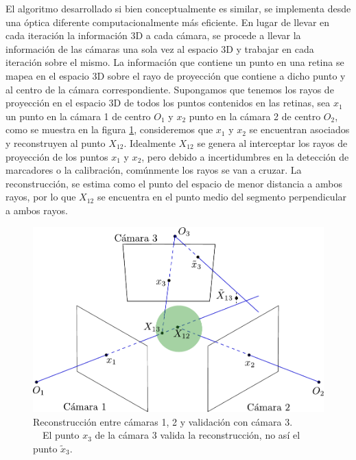 El algoritmo desarrollado si bien conceptualmente es similar, se implementa desde una óptica diferente computacionalmente más eficiente.
En lugar de llevar en cada iteración la información 3D a cada cámara, se procede a llevar la información de las cámaras una sola vez al espacio 3D y trabajar en cada iteración sobre el mismo. La información que contiene un punto en una retina se mapea en el espacio 3D sobre el rayo de proyección que contiene a dicho punto y al centro de la cámara correspondiente. Supongamos que tenemos los rayos de proyección en el espacio 3D de todos los puntos contenidos en las retinas, sea $x_1$ un punto en la cámara 1 de centro $O_1$ y $x_2$ punto en la cámara 2 de centro $O_2$, como se muestra en la figura \ref{img_reconstruccion_validacion}, consideremos que $x_1$ y $x_2$ se encuentran asociados y reconstruyen al punto $X_{12}$. Idealmente $X_{12}$ se genera al interceptar los rayos de proyección de los puntos $x_1$ y $x_2$, pero debido a incertidumbres en la detección de marcadores o la calibración, comúnmente los rayos se van a cruzar. La reconstrucción, se estima como el punto del espacio de menor distancia a ambos rayos, por lo que
$X_{12}$ se encuentra en el punto medio del segmento perpendicular a ambos rayos.


\begin{figure}[h!]
\centering
\captionsetup{justification=centering,margin=2.8cm}
\includegraphics[scale=0.7]{img/Reconstruccion/validacion.pdf}
\caption{Reconstrucción entre cámaras 1, 2 y validación con cámara 3. \\ ~~El punto $x_3$ de la cámara 3 valida la reconstrucción, no así el punto $\tilde{x}_3$.}
\label{img_reconstruccion_validacion}
\end{figure}

